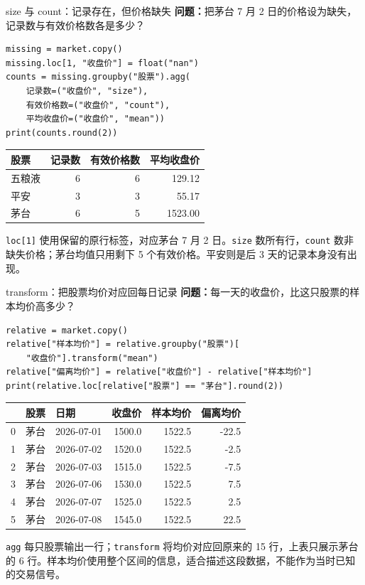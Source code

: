 \documentclass[9pt]{ctexbeamer}
\begin{document}
\begin{frame}[fragile]{size 与 count：记录存在，但价格缺失}
\small \textbf{问题：}把茅台 7 月 2 日的价格设为缺失，记录数与有效价格数各是多少？
\begin{lstlisting}
missing = market.copy()
missing.loc[1, "收盘价"] = float("nan")
counts = missing.groupby("股票").agg(
    记录数=("收盘价", "size"),
    有效价格数=("收盘价", "count"),
    平均收盘价=("收盘价", "mean"))
print(counts.round(2))
\end{lstlisting}
\begin{center}
\begin{tabular}{lrrr}
\toprule
股票 & 记录数 & 有效价格数 & 平均收盘价 \\
\midrule
五粮液 & 6 & 6 & 129.12 \\
平安 & 3 & 3 & 55.17 \\
茅台 & 6 & 5 & 1523.00 \\
\bottomrule
\end{tabular}
\end{center}
\small \texttt{loc[1]} 使用保留的原行标签，对应茅台 7 月 2 日。\texttt{size} 数所有行，\texttt{count} 数非缺失价格；茅台均值只用剩下 5 个有效价格。平安则是后 3 天的记录本身没有出现。
\end{frame}

\begin{frame}[fragile]{transform：把股票均价对应回每日记录}
\small \textbf{问题：}每一天的收盘价，比这只股票的样本均价高多少？
\begin{lstlisting}[basicstyle=\ttfamily\scriptsize]
relative = market.copy()
relative["样本均价"] = relative.groupby("股票")[
    "收盘价"].transform("mean")
relative["偏离均价"] = relative["收盘价"] - relative["样本均价"]
print(relative.loc[relative["股票"] == "茅台"].round(2))
\end{lstlisting}
\begin{center}
\small
\begin{tabular}{rllrrr}
\toprule
 & 股票 & 日期 & 收盘价 & 样本均价 & 偏离均价 \\
\midrule
0 & 茅台 & 2026-07-01 & 1500.0 & 1522.5 & -22.5 \\
1 & 茅台 & 2026-07-02 & 1520.0 & 1522.5 & -2.5 \\
2 & 茅台 & 2026-07-03 & 1515.0 & 1522.5 & -7.5 \\
3 & 茅台 & 2026-07-06 & 1530.0 & 1522.5 & 7.5 \\
4 & 茅台 & 2026-07-07 & 1525.0 & 1522.5 & 2.5 \\
5 & 茅台 & 2026-07-08 & 1545.0 & 1522.5 & 22.5 \\
\bottomrule
\end{tabular}
\end{center}
\small \texttt{agg} 每只股票输出一行；\texttt{transform} 将均价对应回原来的 15 行，上表只展示茅台的 6 行。样本均价使用整个区间的信息，适合描述这段数据，不能作为当时已知的交易信号。
\end{frame}
\end{document}
